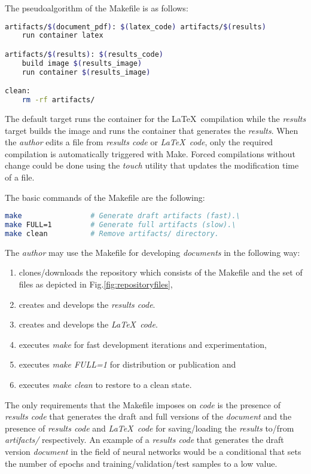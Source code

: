 \documentclass[journal]{IEEEtran}
\begin{document}
The pseudoalgorithm of the Makefile is as follows:
\begin{lstlisting}[language=bash, style=lststyle, caption={Pseudoalgorithm of the Makefile.}]
artifacts/$(document_pdf): $(latex_code) artifacts/$(results)
	run container latex

artifacts/$(results): $(results_code)
	build image $(results_image)
	run container $(results_image)

clean:
	rm -rf artifacts/
\end{lstlisting}

The default target runs the container for the \LaTeX\ compilation while the \textit{results} target builds the image and runs the container that generates the \textit{results}.
When the \textit{author} edits a file from \textit{results code} or \textit{\LaTeX\ code}, only the required compilation is automatically triggered with Make.
Forced compilations without change could be done using the \textit{touch} utility that updates the modification time of a file.

The basic commands of the Makefile are the following:
\begin{lstlisting}[language=bash, style=lststyle, caption={Basic Makefile commands.}]
make                # Generate draft artifacts (fast).\ 
make FULL=1         # Generate full artifacts (slow).\ 
make clean          # Remove artifacts/ directory.
\end{lstlisting}

The \textit{author} may use the Makefile for developing \textit{documents} in the following way:
\begin{enumerate}
	\item clones/downloads the repository which consists of the Makefile and the set of files as depicted in Fig.\ref{fig:repositoryfiles},
	\item creates and develops the \textit{results code}.
	\item creates and develops the \textit{\LaTeX\ code}.
	\item executes \textit{make} for fast development iterations and experimentation,
	\item executes \textit{make FULL=1} for distribution or publication and
	\item executes \textit{make clean} to restore to a clean state.
\end{enumerate}

The only requirements that the Makefile imposes on \textit{code} is the presence of \textit{results code} that generates the draft and full versions of the \textit{document} and the presence of \textit{results code} and \textit{\LaTeX\ code} for saving/loading the \textit{results} to/from \textit{artifacts/} respectively.
An example of a \textit{results code} that generates the draft version \textit{document} in the field of neural networks would be a conditional that sets the number of epochs and training/validation/test samples to a low value.
\end{document}
